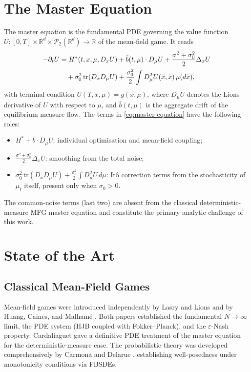 \section{The Master Equation}

The master equation is the fundamental PDE governing the value function
$U: [0,T] \times \mathbb{R}^d \times \mathcal{P}_2(\mathbb{R}^d) \to \mathbb{R}$
of the mean-field game. It reads
\begin{align}
    -\partial_t U &= H^*(t,x,\mu, D_x U) + \bar{b}(t,\mu) \cdot D_\mu U
    + \frac{\sigma^2 + \sigma_0^2}{2}\Delta_x U \notag \\
    &\quad + \sigma_0^2 \,\mathrm{tr}(D_x D_\mu U)
    + \frac{\sigma_0^2}{2} \int D_\mu^2 U(\tilde{x},\tilde{x})\, \mu(d\tilde{x}),
    \label{eq:master-equation}
\end{align}
with terminal condition $U(T,x,\mu) = g(x,\mu)$, where $D_\mu U$ denotes the
Lions derivative of $U$ with respect to $\mu$, and $\bar{b}(t,\mu)$ is the
aggregate drift of the equilibrium measure flow. The terms in
\eqref{eq:master-equation} have the following roles:
\begin{itemize}
    \item $H^* + \bar{b} \cdot D_\mu U$: individual optimisation and mean-field
    coupling;
    \item $\frac{\sigma^2+\sigma_0^2}{2}\Delta_x U$: smoothing from the total noise;
    \item $\sigma_0^2 \,\mathrm{tr}(D_x D_\mu U) + \frac{\sigma_0^2}{2}\int
    D_\mu^2 U\, d\mu$: It\^{o} correction terms from the stochasticity of $\mu_t$
    itself, present only when $\sigma_0 > 0$.
\end{itemize}
The common-noise terms (last two) are absent from the classical deterministic-measure
MFG master equation and constitute the primary analytic challenge of this work.

\section{State of the Art}

\subsection{Classical Mean-Field Games}

Mean-field games were introduced independently by Lasry and Lions
\citep{lasrylions2007} and by Huang, Caines, and Malham\'e \citep{huangetal2006}.
Both papers established the fundamental $N \to \infty$ limit, the PDE system (HJB
coupled with Fokker--Planck), and the $\varepsilon$-Nash property. Cardaliaguet
\citep{cardaliaguet2010notes} gave a definitive PDE treatment of the master equation
for the deterministic-measure case. The probabilistic theory was developed
comprehensively by Carmona and Delarue \citep{carmonadelarue2018}, establishing
well-posedness under monotonicity conditions via FBSDEs.

